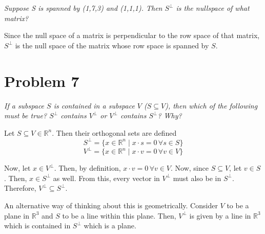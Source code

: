 \documentclass{article}
\begin{document}
\textit{Suppose S is spanned by (1,7,3) and (1,1,1). Then $S^\perp$ is the
nullspace of what matrix?}

\bigbreak

Since the null space of a matrix is perpendicular to the row space of that
matrix, $ S^\perp $ is the null space of the matrix whose row space is
spanned by $ S $.

\section*{Problem 7}

\textit{If a subspace $S$ is contained in a subspace $V$ ($S \subseteq V$),
then which of the following must be true? $S^\perp$ contains $V^\perp$ or
$V^\perp$ contains $S^\perp$? Why?}

\bigbreak

Let $ S \subseteq V \in \mathbb{R}^n $. Then their orthogonal sets are
defined
$$ S^\perp = \{ x \in \mathbb{R}^n \mid x \cdot s = 0\, \forall s \in S \} $$
$$ V^\perp = \{ x \in \mathbb{R}^n \mid x \cdot v = 0\, \forall v \in V \} $$

Now, let $ x \in V^\perp $. Then, by definition, $ x \cdot v = 0\, \forall v
\in V $. Now, since $ S \subseteq V $, let $ v \in S $. Then, $ x \in S^\perp
$ as well. From this, every vector in $ V^\perp $ must also be in $ S^\perp
$. Therefore, $ V^\perp \subseteq S^\perp $.

An alternative way of thinking about this is geometrically. Consider $ V $ to
be a plane in $ \mathbb{R}^3 $ and $ S $ to be a line within this plane.
Then, $ V^\perp $ is given by a line in $ \mathbb{R}^3 $ which is contained
in $ S^\perp $ which is a plane.
\end{document}
